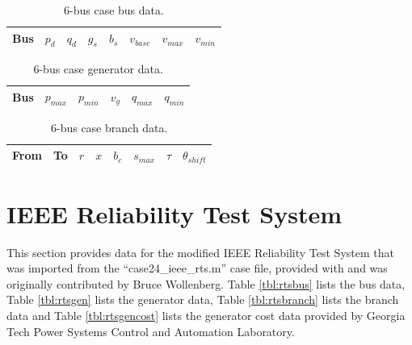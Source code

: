 
\begin{table}[h]
\caption{6-bus case bus data.}
\label{tbl:case6ww_bus}
\begin{center}
\begin{tabular}{c|c|c|c|c|c|c|c}
\hline
Bus &$p_d$ &$q_d$ &$g_s$ &$b_s$ &$v_{base}$ &$v_{max}$ &$v_{min}$\\
\hline\hline

\hline
\end{tabular}
\end{center}
\end{table}

\begin{table}[h]
\caption{6-bus case generator data.}
\label{tbl:case6ww_gen}
\begin{center}
\begin{tabular}{c|c|c|c|c|c}
\hline
Bus &$p_{max}$ &$p_{min}$ &$v_g$ &$q_{max}$ &$q_{min}$\\
\hline\hline

\hline
\end{tabular}
\end{center}
\end{table}

\begin{table}[h]
\caption{6-bus case branch data.}
\label{tbl:case6ww_branch}
\begin{center}
\begin{tabular}{c|c|c|c|c|c|c|c}
\hline
From &To &$r$ &$x$ &$b_c$ &$s_{max}$ &$\tau$ &$\theta_{shift}$\\
\hline\hline

\hline
\end{tabular}
\end{center}
\end{table}

\section{IEEE Reliability Test System}
\label{adx:ieee_rts}
This section provides data for the modified IEEE Reliability Test System that
was imported from the ``case24\_ieee\_rts.m'' case file, provided with \matpower
and was originally contributed by Bruce Wollenberg.
Table \ref{tbl:rtsbus} lists the bus data, Table \ref{tbl:rtsgen} lists the
generator data, Table \ref{tbl:rtsbranch} lists the branch data and Table
\ref{tbl:rtsgencost} lists the generator cost data provided by Georgia Tech
Power Systems Control and Automation Laboratory.

